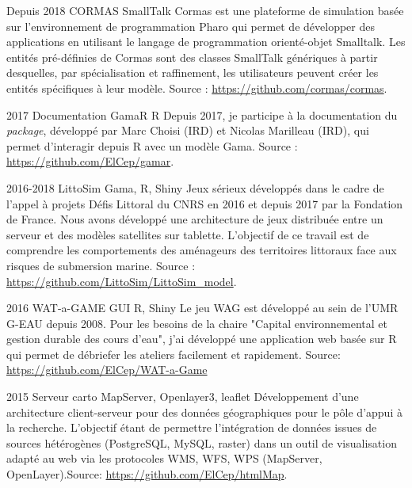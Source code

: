 \documentclass[]{cv-etienne}
\begin{document}
\begin{entrylist}
\entry
{Depuis 2018}
{CORMAS}
{SmallTalk}
{
 Cormas est une plateforme de simulation basée sur l'environnement de programmation Pharo qui permet de développer des applications en utilisant le langage de programmation orienté-objet Smalltalk. Les entités pré-définies de Cormas sont des classes SmallTalk génériques à partir desquelles, par spécialisation et raffinement, les utilisateurs peuvent créer les entités spécifiques à leur modèle. Source : \url{https://github.com/cormas/cormas}.
}
\end{entrylist}
\begin{entrylist}
\entry
{2017}
{Documentation GamaR}
{R}
{
Depuis 2017, je participe à la documentation du \textit{package}, développé par Marc Choisi (IRD) et Nicolas Marilleau (IRD), qui permet d'interagir depuis R avec un modèle Gama. Source : \url{https://github.com/ElCep/gamar}.
}
\end{entrylist}

\begin{entrylist}
\entry
{2016-2018}
{LittoSim}
{Gama, R, Shiny}
{
Jeux sérieux développés dans le cadre de l'appel à projets Défis Littoral du CNRS en 2016 et depuis 2017 par la Fondation de France. Nous avons développé une architecture de jeux distribuée entre un serveur et des modèles satellites sur tablette. L'objectif de ce travail est de comprendre les comportements des aménageurs des territoires littoraux face aux risques de submersion marine. Source : \url{https://github.com/LittoSim/LittoSim_model}.
}
\end{entrylist}
\begin{entrylist}
\entry
{2016}
{WAT-a-GAME GUI}
{R, Shiny}
{
Le jeu WAG est développé au sein de l'UMR G-EAU depuis 2008. Pour les besoins de la chaire "Capital environnemental et gestion durable des cours d'eau", j'ai développé une application web basée sur R qui permet de débriefer les ateliers facilement et rapidement. Source: \url{https://github.com/ElCep/WAT-a-Game}
}
\end{entrylist}

\begin{entrylist}
\entry
{2015}
{Serveur carto}
{MapServer, Openlayer3, leaflet}
{
Développement d'une architecture client-serveur pour des données géographiques pour le pôle d'appui à la recherche. L'objectif étant de permettre l'intégration de données issues de sources hétérogènes (PostgreSQL, MySQL, raster) dans un outil de visualisation adapté au web via les protocoles WMS, WFS, WPS (MapServer, OpenLayer).Source: \url{https://github.com/ElCep/htmlMap}.
}
\end{entrylist}
\end{document}
